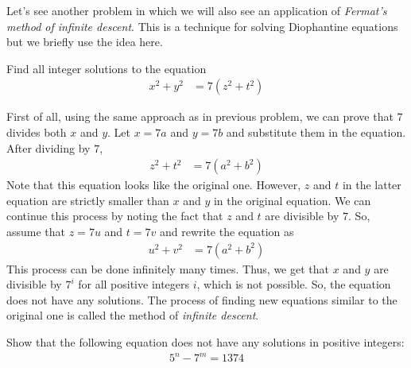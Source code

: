 \documentclass{subfile}
\begin{document}
			Let's see another problem in which we will also see an application of \textit{Fermat's method of infinite descent}. This is a technique for solving Diophantine equations but we briefly use the idea here.
				\begin{problem}
					Find all integer solutions to the equation
						\begin{align*}
							x^2+y^2 & = 7(z^2+t^2)
						\end{align*}
				\end{problem}

				\begin{solution}
					First of all, using the same approach as in previous problem, we can prove that $7$ divides both $x$ and $y$. Let $x=7a$ and $y=7b$ and substitute them in the equation. After dividing by $7$,
						\begin{align*}
							z^2+t^2 & = 7(a^2+b^2)
						\end{align*}
					Note that this equation looks like the original one. However, $z$ and $t$ in the latter equation are strictly smaller than $x$ and $y$ in the original equation. We can continue this process by noting the fact that $z$ and $t$ are divisible by $7$. So, assume that $z=7u$ and $t=7v$ and rewrite the equation as
						\begin{align*}
						u^2+v^2 & = 7(a^2+b^2)
						\end{align*}
					This process can be done infinitely many times. Thus, we get that $x$ and $y$ are divisible by $7^i$ for all positive integers $i$, which is not possible. So, the equation does not have any solutions. The process of finding new equations similar to the original one is called the method of \textit{infinite descent}.
				\end{solution}


				\begin{problem}
					Show that the following equation does not have any solutions in positive integers:
						\begin{align*}
							5^n-7^m = 1374
						\end{align*}
				\end{problem}
\end{document}
